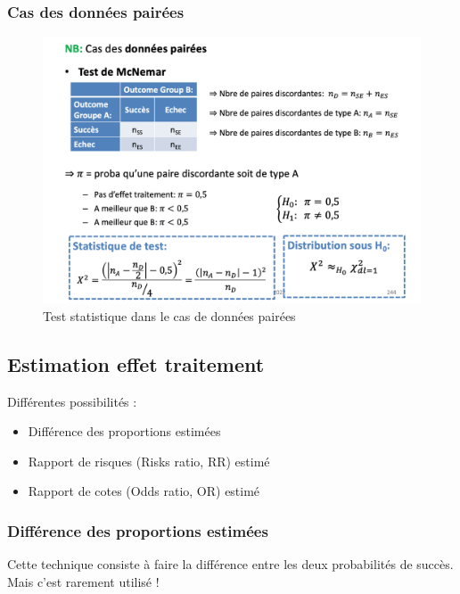 \subsubsection{Cas des données pairées}

\begin{figure}[H]
    \centering
    \includegraphics[scale = 0.5]{images/donnespaires.png}
    \caption{Test statistique dans le cas de données pairées}
    \label{fig:paires}
\end{figure}

\subsection{Estimation effet traitement}

Différentes possibilités :
\begin{itemize}
    \item Différence des proportions estimées
    \item Rapport de risques (Risks ratio, RR) estimé
    \item Rapport de cotes (Odds ratio, OR) estimé
\end{itemize}

\subsubsection{Différence des proportions estimées}
Cette technique consiste à faire la différence entre les deux probabilités de succès. Mais c'est rarement utilisé !

